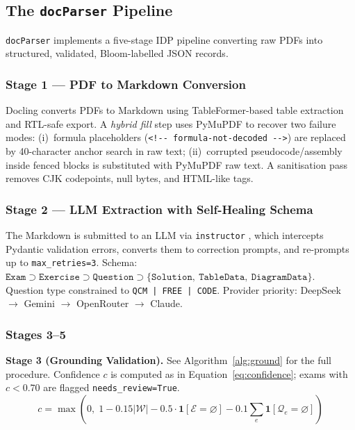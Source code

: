 \subsection{The \texttt{docParser} Pipeline}
\label{subsec:docparser}

\texttt{docParser} implements a five-stage IDP pipeline converting raw PDFs into
structured, validated, Bloom-labelled JSON records.

\subsubsection{Stage 1 --- PDF to Markdown Conversion}

Docling \cite{docling2024} converts PDFs to Markdown using TableFormer-based table
extraction and RTL-safe export. A \textit{hybrid fill} step uses PyMuPDF
\cite{pymupdf2023} to recover two failure modes: (i)~formula placeholders
(\texttt{<!-{}-~formula-not-decoded~-{}-{}>}) are replaced by 40-character anchor
search in raw text; (ii)~corrupted pseudocode/assembly inside fenced blocks is
substituted with PyMuPDF raw text. A sanitisation pass removes CJK codepoints,
null bytes, and HTML-like tags.

\subsubsection{Stage 2 --- LLM Extraction with Self-Healing Schema}

The Markdown is submitted to an LLM via \texttt{instructor} \cite{instructor2023},
which intercepts Pydantic validation errors, converts them to correction prompts,
and re-prompts up to \texttt{max\_retries=3}.
Schema: $\texttt{Exam} \supset \texttt{Exercise} \supset \texttt{Question} \supset
\{\texttt{Solution},\ \texttt{TableData},\ \texttt{DiagramData}\}$.
Question type constrained to \texttt{QCM | FREE | CODE}.
Provider priority: DeepSeek $\to$ Gemini $\to$ OpenRouter $\to$ Claude.

\subsubsection{Stages 3--5}

\textbf{Stage 3 (Grounding Validation).}
See Algorithm~\ref{alg:ground} for the full procedure.
Confidence $c$ is computed as in Equation~\ref{eq:confidence};
exams with $c < 0.70$ are flagged \texttt{needs\_review=True}.
\begin{equation}
  c = \max\!\left(0,\; 1 - 0.15|\mathcal{W}|
      - 0.5\cdot\mathbf{1}[\mathcal{E}{=}\varnothing]
      - 0.1\!\sum_{e}\mathbf{1}[\mathcal{Q}_e{=}\varnothing]\right)
  \label{eq:confidence}
\end{equation}

